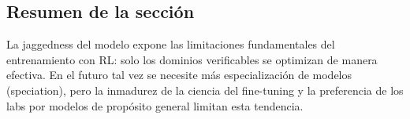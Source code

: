 \subsection{Resumen de la sección}

La jaggedness del modelo expone las limitaciones fundamentales del entrenamiento con RL: solo los dominios verificables se optimizan de manera efectiva. En el futuro tal vez se necesite más especialización de modelos (speciation), pero la inmadurez de la ciencia del fine-tuning y la preferencia de los labs por modelos de propósito general limitan esta tendencia.


